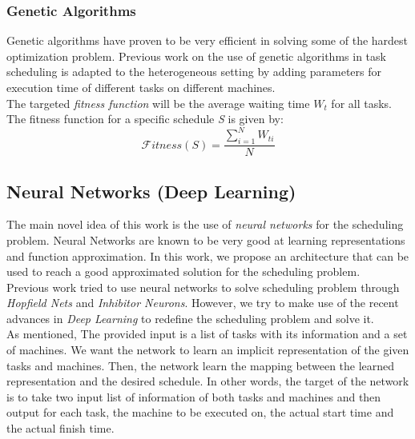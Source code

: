 \documentclass[twocolumn,11pt]{IEEEtran}
\begin{document}
\subsubsection{Genetic Algorithms}
Genetic algorithms\cite{article2} have proven to be very efficient in solving some of the hardest optimization problem. Previous work on the use of genetic algorithms in task scheduling \cite{article2} is adapted to the heterogeneous setting by adding parameters for execution time of different tasks on different machines. \\
The targeted \emph{fitness function} will be the average waiting time $W_t$ for all tasks. The fitness function for a specific schedule \emph{S} is given by:
\begin{equation}
\mathcal Fitness(S) = \frac{\sum_{i=1}^{N} W_{ti}}{N}
\end{equation}

\subsection{Neural Networks (Deep Learning)}
The main novel idea of this work is the use of \emph{neural networks} for the scheduling problem. Neural Networks are known to be very good at learning representations and function approximation. In this work, we propose an architecture that can be used to reach a good approximated solution for the scheduling problem. \\
Previous work tried to use neural networks to solve scheduling problem through \emph{Hopfield Nets} and \emph{Inhibitor Neurons}\cite{article3}. However, we try to make use of the recent advances in \emph{Deep Learning} to redefine the scheduling problem and solve it. \\
As mentioned, The provided input is a list of tasks with its information and a set of machines. We want the network to learn an implicit representation of the given tasks and machines. Then, the network learn the mapping between the learned representation and the desired schedule. In other words, the target of the network is to take two input list of information of both tasks and machines and then output for each task, the machine to be executed on, the actual start time and the actual finish time.
    
\end{document}
